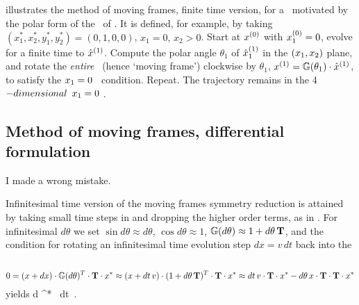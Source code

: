  illustrates the method of moving frames,
finite time version, for a \slice\ motivated by the polar
form of the \cLe\ of . It is
defined, for example, by taking
$(x^{*}_1,x^{*}_2,y_1^{*},y_2^{*})=(0,1,0,0)$,
$x_1=0,\,x_2>0$. Start at $x^{(0)}$ with $x_1^{(0)}
=0$, evolve for a finite time to $\hat{x}^{(1)}$. Compute
the polar angle $\theta_1$ of $\hat{x}^{(1)}_1$ in the
$(x_1,x_2)$ plane, and rotate the {\em entire}
\statesp\ (hence `moving frame') clockwise by $\theta_1$,
$x^{(1)} = \mathbb{G}(\theta_1) \cdot \hat{x}^{(1)}$,
to satisfy the $x_1=0$ \slice\ condition. Repeat. The
trajectory remains in the 4$-dimensional$ $x_1=0$
\reducedsp.

\subsection{Method of moving frames, differential formulation}
\label{sect:MovFrameODE}


\begin{bartlett}
I made a wrong mistake.
\end{bartlett}


Infinitesimal time version of the moving frames symmetry
reduction is attained by taking small time steps in
 and dropping the higher order terms, as
in . For infinitesimal  $d\theta$ we
set $\sin d\theta \approx d\theta$, $\cos d\theta \approx
1$, $\mathbb{G}(d\theta) \approx {1}+ d\theta \, \mathbf{T} $, and
the condition  for rotating an infinitesimal
time evolution step $dx = v\,dt$ back into the \slice\
\[
0 = (x + dx) \cdot \mathbb{G}(d\theta)^T \cdot \mathbf{T} \cdot x^{*}
  \approx (x + dt\,v) \cdot (1+ d\theta\,\mathbf{T})^T \cdot \mathbf{T} \cdot x^{*}
  \approx dt\,v \cdot \mathbf{T} \cdot x^{*} - d\theta\,x \cdot \mathbf{T} \cdot \mathbf{T} \cdot x^{*}
\]
yields
\beq
d\theta \approx {}
                     { \ssp \cdot \Lg \cdot \Lg \cdot \ssp^{*}} \,  dt
\,.


